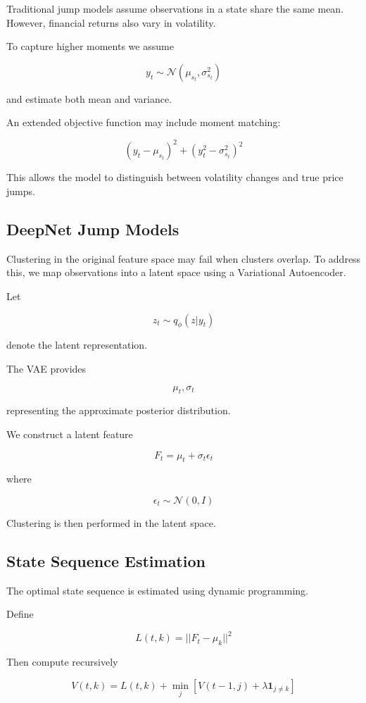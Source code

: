 \documentclass[11pt]{article}
\begin{document}
Traditional jump models assume observations in a state share the
same mean. However, financial returns also vary in volatility.

To capture higher moments we assume

\[
y_t \sim \mathcal{N}(\mu_{s_t}, \sigma^2_{s_t})
\]

and estimate both mean and variance.

An extended objective function may include moment matching:

\[
(y_t - \mu_{s_t})^2 + (y_t^2 - \sigma_{s_t}^2)^2
\]

This allows the model to distinguish between volatility changes
and true price jumps.

\subsection{DeepNet Jump Models}

Clustering in the original feature space may fail when clusters
overlap. To address this, we map observations into a latent space
using a Variational Autoencoder.

Let

\[
z_t \sim q_{\phi}(z|y_t)
\]

denote the latent representation.

The VAE provides

\[
\mu_t, \sigma_t
\]

representing the approximate posterior distribution.

We construct a latent feature

\[
F_t = \mu_t + \sigma_t \epsilon_t
\]

where

\[
\epsilon_t \sim \mathcal{N}(0,I)
\]

Clustering is then performed in the latent space.

\subsection{State Sequence Estimation}

The optimal state sequence is estimated using dynamic programming.

Define

\[
L(t,k) = ||F_t - \mu_k||^2
\]

Then compute recursively

\[
V(t,k) =
L(t,k)
+
\min_j
\left[
V(t-1,j) + \lambda \mathbf{1}_{j \neq k}
\right]
\]
\end{document}
